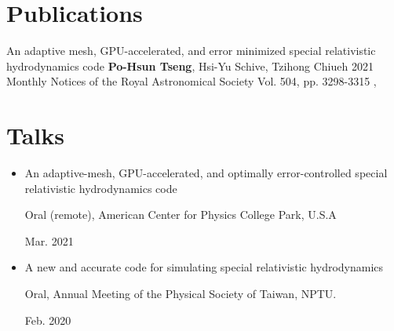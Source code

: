 \documentclass[%
               doublesided,
               paper=a4,
               fontsize=10pt
              ]{resume}
\begin{document}

\pagestyle{empty}

\section{Publications}
\pubforcefullwidth

%

\publication
	{An adaptive mesh, GPU-accelerated,
         and error minimized special relativistic hydrodynamics code} %
	{\textbf{Po-Hsun Tseng}, Hsi-Yu Schive, Tzihong Chiueh} %
	{2021} %
	{Monthly Notices of the Royal Astronomical Society Vol. 504, pp. 3298-3315} %
	{,
         } %


\section{Talks}
\begin{itemize}
\item
          An adaptive-mesh, GPU-accelerated, and optimally error-controlled
          special relativistic hydrodynamics code\\
          \begin{minipage}{6in}
       	  Oral (remote), American Center for Physics College Park, U.S.A
          \end{minipage}
          \hfill
          \begin{minipage}{1in}
          Mar. 2021
          \end{minipage}
\item
          A new and accurate code for simulating special relativistic hydrodynamics\\
          \begin{minipage}{6in}
          Oral, Annual Meeting of the Physical Society of Taiwan, NPTU.
          \end{minipage}
          \hfill
          \begin{minipage}{1in}
          Feb. 2020
          \end{minipage}
\end{itemize}
\end{document}
